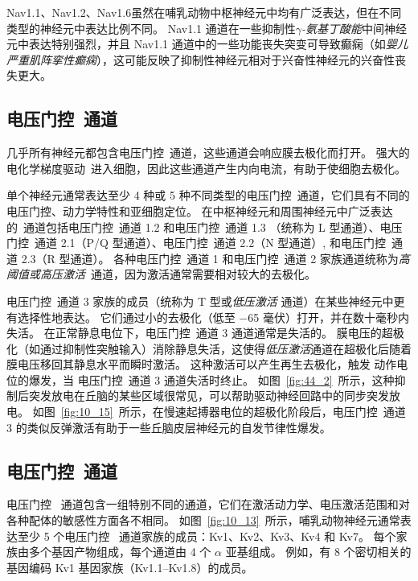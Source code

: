 Nav1.1、Nav1.2、Nav1.6虽然在哺乳动物中枢神经元中均有广泛表达，但在不同类型的神经元中表达比例不同。
Nav1.1 通道在一些抑制性\textit{$\gamma$-氨基丁酸能}中间神经元中表达特别强烈，并且 Nav1.1 通道中的一些功能丧失突变可导致癫痫（如\textit{婴儿严重肌阵挛性癫痫}），这可能反映了抑制性神经元相对于兴奋性神经元的兴奋性丧失更大。



\subsection{电压门控~通道}

几乎所有神经元都包含电压门控~通道，这些通道会响应膜去极化而打开。
强大的电化学梯度驱动~进入细胞，因此这些通道产生内向电流，有助于使细胞去极化。


单个神经元通常表达至少 4 种或 5 种不同类型的电压门控~通道，它们具有不同的电压门控、动力学特性和亚细胞定位。
在中枢神经元和周围神经元中广泛表达的~通道包括电压门控~通道 1.2 和电压门控~通道 1.3 （统称为 L 型通道）、电压门控~通道 2.1（P/Q 型通道）、电压门控~通道 2.2（N 型通道）, 和电压门控~通道 2.3（R 型通道）。
各种电压门控~通道 1 和电压门控~通道 2 家族通道统称为\textit{高阈值或高压激活}~通道，因为激活通常需要相对较大的去极化。


电压门控~通道 3 家族的成员（统称为 T 型或\textit{低压激活} 通道）在某些神经元中更有选择性地表达。
它们通过小的去极化（低至 −65 毫伏）打开，并在数十毫秒内失活。
在正常静息电位下，电压门控~通道 3 通道通常是失活的。
膜电压的超极化（如通过抑制性突触输入）消除静息失活，这使得\textit{低压激活}通道在超极化后随着膜电压移回其静息水平而瞬时激活。
这种激活可以产生再生去极化，触发  动作电位的爆发，当 电压门控~通道 3 通道失活时终止。 
如图~\ref{fig:44_2}~所示，这种抑制后突发放电在丘脑的某些区域很常见，可以帮助驱动神经回路中的同步突发放电。 
如图~\ref{fig:10_15}~所示，在慢速起搏器电位的超极化阶段后，电压门控~通道 3 的类似反弹激活有助于一些丘脑皮层神经元的自发节律性爆发。



\subsection{电压门控~通道}

电压门控~ 通道包含一组特别不同的通道，它们在激活动力学、电压激活范围和对各种配体的敏感性方面各不相同。
如图~\ref{fig:10_13}~所示，哺乳动物神经元通常表达至少 5 个电压门控~ 通道家族的成员：Kv1、Kv2、Kv3、Kv4 和 Kv7。
每个家族由多个基因产物组成，每个通道由 4 个 $\alpha$ 亚基组成。
例如，有 8 个密切相关的基因编码 Kv1 基因家族（Kv1.1–Kv1.8）的成员。


